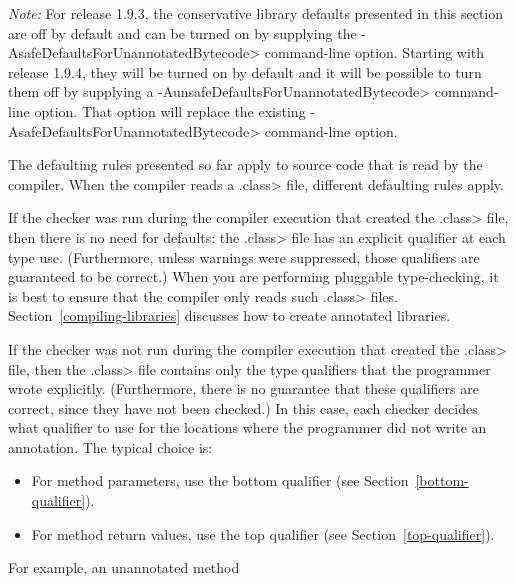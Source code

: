 \emph{Note:} For release 1.9.3, the conservative library defaults presented in this section
are off by default and can be turned on by supplying the \<-AsafeDefaultsForUnannotatedBytecode>
command-line option.  Starting with release 1.9.4, they will be turned on
by default and it will be possible to turn them off by supplying a
\<-AunsafeDefaultsForUnannotatedBytecode> command-line option.
That option will replace the existing \<-AsafeDefaultsForUnannotatedBytecode>
command-line option.

The defaulting rules presented so far apply to source code that is read by
the compiler.  When the compiler reads a \<.class> file, different
defaulting rules apply.

If the checker was run during the compiler execution that created the
\<.class> file,
then there is no need for
defaults:  the \<.class> file has an explicit qualifier at each type use.
(Furthermore, unless warnings were suppressed, those qualifiers are
guaranteed to be correct.)
When you are performing pluggable type-checking,
it is best to ensure that the compiler only reads such \<.class> files.
Section~\ref{compiling-libraries} discusses how to create annotated
libraries.

If the checker was not run during the compiler execution that created the
\<.class> file, then the \<.class> file contains only the type qualifiers
that the programmer wrote explicitly.  (Furthermore, there is no guarantee
that these qualifiers are correct, since they have not been checked.)
In this case, each checker decides what qualifier to use for the
locations where the programmer did not write an annotation.  The typical
choice is:

\begin{itemize}
\item
  For method parameters, use the bottom qualifier (see
  Section~\ref{bottom-qualifier}).
\item
  For method return values, use the top qualifier (see
  Section~\ref{top-qualifier}).
\end{itemize}

For example, an unannotated method

